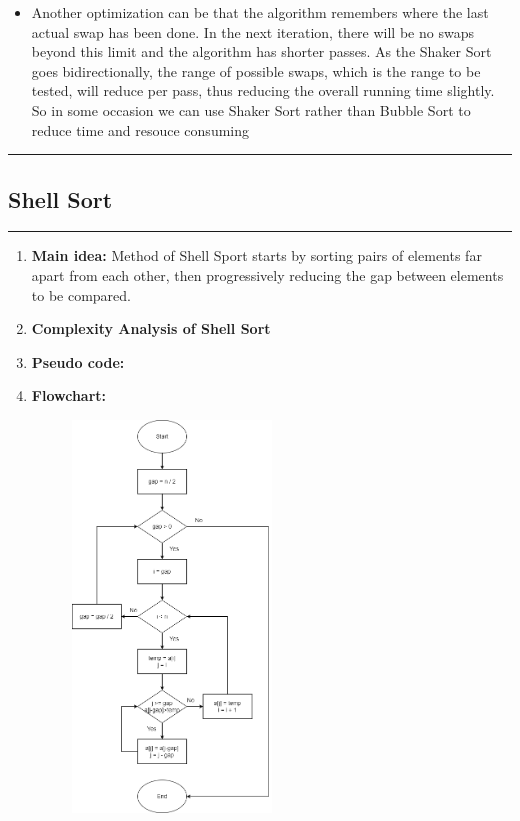 \documentclass[11pt,a4paper]{article}
\begin{document}
{\begin{enumerate}[label=\textbf{\arabic*})]
\begin{itemize}
						\item Another optimization can be that the algorithm remembers where the last actual swap has been done. In the next iteration, there will be no swaps beyond this limit and the algorithm has shorter passes. As the Shaker Sort goes bidirectionally, the range of possible swaps, which is the range to be tested, will reduce per pass, thus reducing the overall running time slightly. So in some occasion we can use Shaker Sort rather than Bubble Sort to reduce time and resouce consuming
					\end{itemize}
			\end{enumerate}
		
		\rule{15cm}{0.1cm}
		\subsection{Shell Sort}
		\rule{15cm}{0.1cm}
			\begin{enumerate}[label=\textbf{\arabic*})]
				\item \textbf{Main idea:}
				Method of Shell Sport starts by sorting pairs of elements far apart from each other, then progressively reducing the gap between elements to be compared.
				\\[12pt]
				\item \textbf{Complexity Analysis of Shell Sort}
				\\[12pt]
				\item \textbf{Pseudo code:} 
				\pagebreak
				\item \textbf{Flowchart:}
					\begin{figure}[H]
						\centering 
						\includegraphics[width=0.5\textwidth]{ShellSortFlowchart}
					\end{figure}
					

\end{enumerate}}
\end{document}
